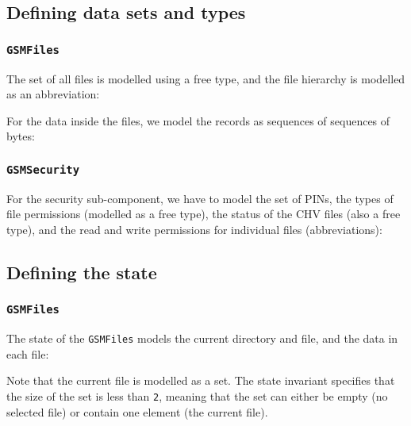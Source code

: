 \subsection{Defining data sets and types}

\subsubsection*{\texttt{GSMFiles}}

The set of all files is modelled using a free type, and the file hierarchy is modelled as an abbreviation:



For the data inside the files, we model the records as sequences of sequences of bytes:



\subsubsection*{\texttt{GSMSecurity}}

For the security sub-component, we have to model the set of PINs, the types of file permissions (modelled as a free type), the status of the CHV files (also a free type), and the read and write permissions for individual files (abbreviations):



\subsection{Defining the state}

\subsubsection*{\texttt{GSMFiles}}

The state of the \texttt{GSMFiles} models the current directory and file, and the data in each file:



Note that the current file is modelled as a set. The state invariant specifies that the size of the set is less than \texttt{2}, meaning that the set can either be empty (no selected file) or contain one element (the current file).

